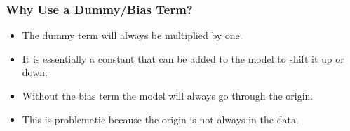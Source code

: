 \documentclass[12pt]{article}
\begin{document}
\begin{itemize}
                    \subsubsection{Why Use a Dummy/Bias Term?}
                        \begin{itemize}
                            \item The dummy term will always be multiplied by one.
                            \item It is essentially a constant that can be added to the model to shift it up or down.
                            \item Without the bias term the model will always go through the origin.
                            \item This is problematic because the origin is not always in the data.
                        \end{itemize}

\end{itemize}
\end{document}
